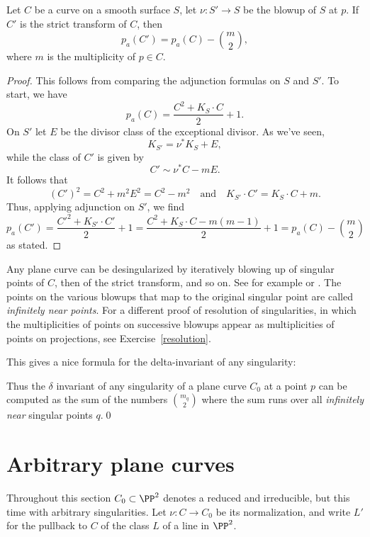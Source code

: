 \begin{proposition}\label{effect of blowup on genus}
 Let $C$ be a curve on a smooth surface $S$, let $\nu : S' \to S$ be the blowup of $S$ at $p$. If $C'$ is the strict transform of $C$, then
 $$
 p_a(C') = p_a(C) -{m\choose 2},
 $$
 where $m$ is the multiplicity of $p\in C$.
\end{proposition}
\begin{proof}
This follows from comparing the adjunction formulas on $S$ and $S'$. To start, we have
$$
p_a(C) = \frac{C^2 + K_S\cdot C}{2} + 1.
$$
On $S'$ let $E$ be the divisor class of the exceptional divisor. As we've seen,
$$
K_{S'} = \nu^*K_S + E,
$$
while the class of $C'$ is given by
$$
C' \sim \nu^*C - mE.
$$
It follows that
$$
(C')^2 = C^2 + m^2E^2 = C^2 - m^2 \quad \text{and} \quad K_{S'}\cdot C' = K_S\cdot C + m.
$$
Thus, applying adjunction on $S'$, we find
$$
p_a(C') = \frac{{C'}^2 + K_{S'}\cdot C'}{2} + 1 = \frac{C^2 + K_S\cdot C - m(m-1)}{2} + 1 = p_a(C) -{m\choose 2}
$$
as stated.
\end{proof}

\begin{fact}
Any plane curve can be desingularized by
iteratively blowing up of singular points of $C$, then of the strict transform, and so on. See for example
\cite[****]{Fulton1989} or \cite[****]{Brieskorn1986}. The points on the various blowups that
map to the original singular point are called \emph{infinitely near points}. For a different proof
of resolution of singularities, in which the multiplicities of points on successive blowups appear as 
multiplicities of points on projections, see Exercise~\ref{resolution}.
\end{fact}

This gives a nice formula for the delta-invariant of any singularity:

\begin{corollary}
\label{computing delta}

Thus the $\delta$ invariant of any singularity of a plane curve $C_{0}$ at a point $p$ can be computed as the sum of the numbers $\binom{m_{q}}{2}$
where the sum runs over all \emph{infinitely near} singular points $q$.\qed
\end{corollary}

\section{Arbitrary plane curves} \label{arbitrary plane curves}

Throughout this section $C_0 \subset \PP^2$ denotes a reduced and irreducible, but  this time with arbitrary singularities. Let $\nu : C \to C_0$ be its normalization, and write $L'$ for the pullback to $C$ of the class $L$ of a line in $\PP^{2}$.

